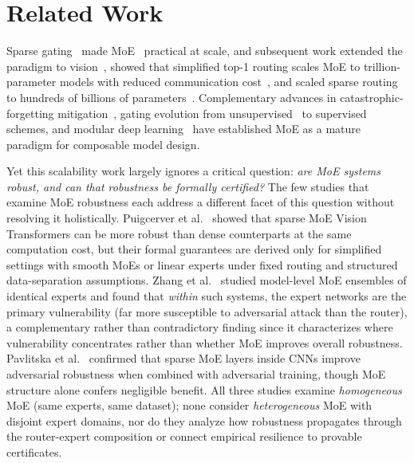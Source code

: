 \documentclass[runningheads]{llncs}
\begin{document}
\section{Related Work}

Sparse gating~\cite{shazeer2017} made MoE~\cite{jacobs1991} practical at scale, and subsequent work extended the paradigm to vision~\cite{riquelme2021}, showed that simplified top-1 routing scales MoE to trillion-parameter models with reduced communication cost~\cite{fedus2022}, and scaled sparse routing to hundreds of billions of parameters~\cite{dai2024,jiang2024,deepseek2024}. Complementary advances in catastrophic-forgetting mitigation~\cite{ramasesh2022}, gating evolution from unsupervised~\cite{jordan1994} to supervised~\cite{riquelme2021} schemes, and modular deep learning~\cite{pfeiffer2023} have established MoE as a mature paradigm for composable model design.

Yet this scalability work largely ignores a critical question: \emph{are MoE systems robust, and can that robustness be formally certified?} The few studies that examine MoE robustness each address a different facet of this question without resolving it holistically. Puigcerver et al.~\cite{puigcerver2022} showed that sparse MoE Vision Transformers can be more robust than dense counterparts at the same computation cost, but their formal guarantees are derived only for simplified settings with smooth MoEs or linear experts under fixed routing and structured data-separation assumptions. Zhang et al.~\cite{zhang2025moe} studied model-level MoE ensembles of identical experts and found that \emph{within} such systems, the expert networks are the primary vulnerability (far more susceptible to adversarial attack than the router), a complementary rather than contradictory finding since it characterizes where vulnerability concentrates rather than whether MoE improves overall robustness. Pavlitska et al.~\cite{pavlitska2025robust} confirmed that sparse MoE layers inside CNNs improve adversarial robustness when combined with adversarial training, though MoE structure alone confers negligible benefit. All three studies examine \emph{homogeneous} MoE (same experts, same dataset); none consider \emph{heterogeneous} MoE with disjoint expert domains, nor do they analyze how robustness propagates through the router-expert composition or connect empirical resilience to provable certificates.
\end{document}

